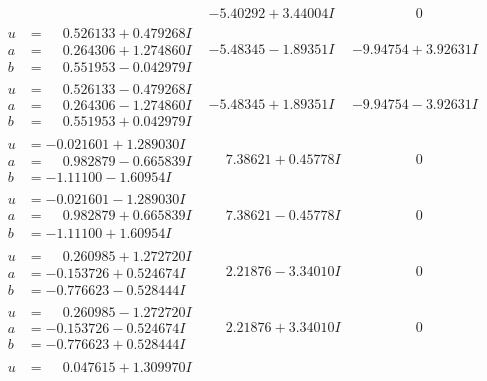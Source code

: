 \documentclass[1p]{elsarticle_modified}
\theoremstyle{definition}
\begin{document}
$$\begin{array}{c|c|c}
 & -5.40292 + 3.44004 I & \phantom{-0.000000 } 0 \\ \hline\begin{aligned}
u &= \phantom{-}0.526133 + 0.479268 I \\
a &= \phantom{-}0.264306 + 1.274860 I \\
b &= \phantom{-}0.551953 - 0.042979 I\end{aligned}
 & -5.48345 - 1.89351 I & -9.94754 + 3.92631 I \\ \hline\begin{aligned}
u &= \phantom{-}0.526133 - 0.479268 I \\
a &= \phantom{-}0.264306 - 1.274860 I \\
b &= \phantom{-}0.551953 + 0.042979 I\end{aligned}
 & -5.48345 + 1.89351 I & -9.94754 - 3.92631 I \\ \hline\begin{aligned}
u &= -0.021601 + 1.289030 I \\
a &= \phantom{-}0.982879 - 0.665839 I \\
b &= -1.11100 - 1.60954 I\end{aligned}
 & \phantom{-}7.38621 + 0.45778 I & \phantom{-0.000000 } 0 \\ \hline\begin{aligned}
u &= -0.021601 - 1.289030 I \\
a &= \phantom{-}0.982879 + 0.665839 I \\
b &= -1.11100 + 1.60954 I\end{aligned}
 & \phantom{-}7.38621 - 0.45778 I & \phantom{-0.000000 } 0 \\ \hline\begin{aligned}
u &= \phantom{-}0.260985 + 1.272720 I \\
a &= -0.153726 + 0.524674 I \\
b &= -0.776623 - 0.528444 I\end{aligned}
 & \phantom{-}2.21876 - 3.34010 I & \phantom{-0.000000 } 0 \\ \hline\begin{aligned}
u &= \phantom{-}0.260985 - 1.272720 I \\
a &= -0.153726 - 0.524674 I \\
b &= -0.776623 + 0.528444 I\end{aligned}
 & \phantom{-}2.21876 + 3.34010 I & \phantom{-0.000000 } 0 \\ \hline\begin{aligned}
u &= \phantom{-}0.047615 + 1.309970 I \\

\end{aligned}
\end{array}$$
\end{document}
